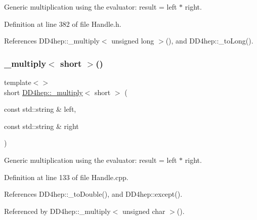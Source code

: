 Generic multiplication using the evaluator\+: result = left $\ast$ right. 



Definition at line 382 of file Handle.\+h.



References D\+D4hep\+::\+\_\+multiply$<$ unsigned long $>$(), and D\+D4hep\+::\+\_\+to\+Long().

\hypertarget{group___d_d4_h_e_p___g_e_o_m_e_t_r_y_gad9f1bbb2b9ed9c95a14056e96c8efa69}{}\label{group___d_d4_h_e_p___g_e_o_m_e_t_r_y_gad9f1bbb2b9ed9c95a14056e96c8efa69} 
\subsubsection{\texorpdfstring{\+\_\+multiply$<$ short $>$()}{\_multiply< short >()}\hspace{0.1cm}{\footnotesize\ttfamily [1/3]}}
{\footnotesize\ttfamily template$<$$>$ \\
short \hyperlink{group___d_d4_h_e_p___g_e_o_m_e_t_r_y_gab860c2299e2eb50e537c5079fb0c9c51}{D\+D4hep\+::\+\_\+multiply}$<$ short $>$ (\begin{DoxyParamCaption}\item[{const std\+::string \&}]{left,  }\item[{const std\+::string \&}]{right }\end{DoxyParamCaption})}



Generic multiplication using the evaluator\+: result = left $\ast$ right. 



Definition at line 133 of file Handle.\+cpp.



References D\+D4hep\+::\+\_\+to\+Double(), and D\+D4hep\+::except().



Referenced by D\+D4hep\+::\+\_\+multiply$<$ unsigned char $>$().

\hypertarget{group___d_d4_h_e_p___g_e_o_m_e_t_r_y_gab7dd39c0ea1a8022e78a51e7e5f51b80}{}\label{group___d_d4_h_e_p___g_e_o_m_e_t_r_y_gab7dd39c0ea1a8022e78a51e7e5f51b80} 

